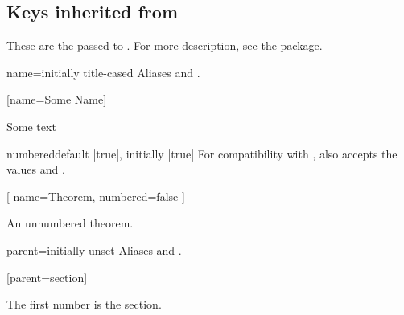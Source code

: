 \documentclass{ltxdoc}
\begin{document}
\subsection{Keys inherited from } \label{thm-thmtools-keys}

These are the  passed to . For more description, see the \href{https://ctan.org/pkg/thmtools}{} package.

\begin{docKey}[][doc label=thm/name]{name}{=}{initially title-cased }
Aliases  and .
\begin{tcbwritetemp}
[name=Some Name]
\end{tcbwritetemp}
\begin{keythmscode}[withpreamble]
\begin{mythm}
Some text
\end{mythm}
\end{keythmscode}
\end{docKey}

\begin{docKey}{numbered}{}{default |true|, initially |true|}
For compatibility with , also accepts the values  and .
\begin{tcbwritetemp}
[
  name=Theorem, numbered=false
  ]
\end{tcbwritetemp}
\begin{keythmscode}[withpreamble]
\begin{theorem*}
An unnumbered theorem.
\end{theorem*}
\end{keythmscode}
\end{docKey}

\begin{docKey}{parent}{=}{initially unset}
Aliases  and .
\begin{tcbwritetemp}
[parent=section]
\end{tcbwritetemp}
\begin{keythmscode}[withpreamble]
\begin{conjecture}
The first number is the section.
\end{conjecture}
\end{keythmscode}
\end{docKey}
\end{document}
